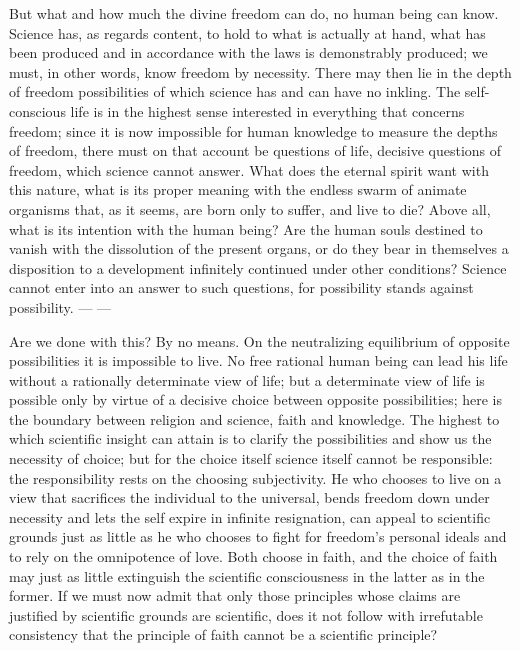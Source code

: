 \documentclass[12pt,a4paper,openany]{book}
\newcommand{\opage}[1]{\marginnote{\footnotesize\textit{[#1]}}}
\begin{document}
But what and how much the divine freedom can do, no human being can know. Science has,
as regards content, to hold to what is actually at hand, what has been produced and in
accordance with the laws is demonstrably produced; we must, in other words, know
freedom by necessity. There may then lie in the depth of freedom possibilities of which
science has and can have no inkling. The self-conscious life is in the highest sense
interested in everything that concerns freedom; since it is now impossible for human
knowledge to measure the depths of freedom, there must on that account be questions of
life, decisive questions of freedom, which science cannot answer. What does the eternal
spirit want with this nature, what is its proper meaning with the endless swarm of
animate organisms that, as it seems, are born only to suffer, and live to die? Above
all, what is its intention with the human being? Are the human souls destined to
vanish with the dissolution of the present organs, or do they bear in themselves a
disposition to a development infinitely continued under other conditions? Science
cannot enter into an answer to such questions, for possibility stands against
possibility. --- ---

Are we done with this? By no means. On the neutralizing equilibrium of opposite
possibilities it is impossible to live. No free rational human being can lead his life
without a rationally
\setcounter{footnote}{0}%
\opage{209}determinate view of life; but a determinate view of life is possible only by
virtue of a decisive choice between opposite possibilities; here is the boundary
between religion and science, faith and knowledge. The highest to which scientific
insight can attain is to clarify the possibilities and show us the necessity of choice;
but for the choice itself science itself cannot be responsible: the responsibility
rests on the choosing subjectivity. He who chooses to live on a view that sacrifices
the individual to the universal, bends freedom down under necessity and lets the self
expire in infinite resignation, can appeal to scientific grounds just as little as he
who chooses to fight for freedom's personal ideals and to rely on the omnipotence of
love. Both choose in faith, and the choice of faith may just as little extinguish the
scientific consciousness in the latter as in the former. If we must now admit that only
those principles whose claims are justified by scientific grounds are scientific, does
it not follow with irrefutable consistency that the principle of faith cannot be a
scientific principle?
\end{document}
